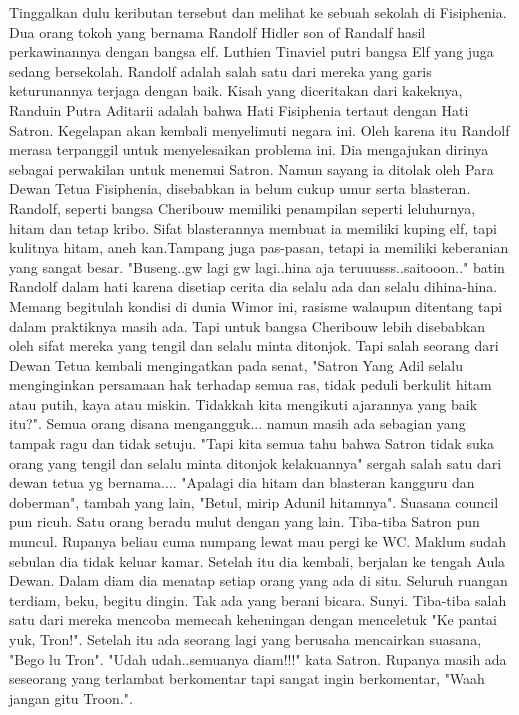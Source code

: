\documentclass[a4paper,11pt,final]{article}
\begin{document}
Tinggalkan dulu keributan tersebut dan melihat ke sebuah sekolah di Fisiphenia. Dua orang tokoh yang bernama Randolf Hidler son of Randalf hasil perkawinannya dengan bangsa elf. Luthien Tinaviel putri bangsa Elf yang juga sedang bersekolah.
Randolf adalah salah satu dari mereka yang garis keturunannya terjaga dengan baik. Kisah yang diceritakan dari kakeknya, Randuin Putra Aditarii adalah bahwa Hati Fisiphenia tertaut dengan Hati Satron. Kegelapan akan kembali menyelimuti negara ini.
Oleh karena itu Randolf merasa terpanggil untuk menyelesaikan problema ini. Dia mengajukan dirinya sebagai perwakilan untuk menemui Satron. Namun sayang ia ditolak oleh Para Dewan Tetua Fisiphenia, disebabkan ia belum cukup umur serta blasteran.
Randolf, seperti bangsa Cheribouw memiliki penampilan seperti leluhurnya, hitam dan tetap kribo. Sifat blasterannya membuat ia memiliki kuping elf, tapi kulitnya hitam, aneh kan.Tampang juga pas-pasan, tetapi ia memiliki keberanian yang sangat besar.
"Buseng..gw lagi gw lagi..hina aja teruuusss..saitooon.." batin Randolf dalam hati karena disetiap cerita dia selalu ada dan selalu dihina-hina.
Memang begitulah kondisi di dunia Wimor ini, rasisme walaupun ditentang tapi dalam praktiknya masih ada. Tapi untuk bangsa Cheribouw lebih disebabkan oleh sifat mereka yang tengil dan selalu minta ditonjok.
Tapi salah seorang dari Dewan Tetua kembali mengingatkan pada senat, "Satron Yang Adil selalu menginginkan persamaan hak terhadap semua ras, tidak peduli berkulit hitam atau putih, kaya atau miskin. Tidakkah kita mengikuti ajarannya yang baik itu?".
Semua orang disana mengangguk... namun masih ada sebagian yang tampak ragu dan tidak setuju.
"Tapi kita semua tahu bahwa Satron tidak suka orang yang tengil dan selalu minta ditonjok kelakuannya" sergah salah satu dari dewan tetua yg bernama....
"Apalagi dia hitam dan blasteran kangguru dan doberman", tambah yang lain, "Betul, mirip Adunil hitamnya". Suasana council pun ricuh. Satu orang beradu mulut dengan yang lain. Tiba-tiba Satron pun muncul.
Rupanya beliau cuma numpang lewat mau pergi ke WC. Maklum sudah sebulan dia tidak keluar kamar.
Setelah itu dia kembali, berjalan ke tengah Aula Dewan. Dalam diam dia menatap setiap orang yang ada di situ. Seluruh ruangan terdiam, beku, begitu dingin. Tak ada yang berani bicara. Sunyi.
Tiba-tiba salah satu dari mereka mencoba memecah keheningan dengan menceletuk "Ke pantai yuk, Tron!".
Setelah itu ada seorang lagi yang berusaha mencairkan suasana, "Bego lu Tron".
"Udah udah..semuanya diam!!!" kata Satron.
Rupanya masih ada seseorang yang terlambat berkomentar tapi sangat ingin berkomentar, "Waah jangan gitu Troon.".
\end{document}
